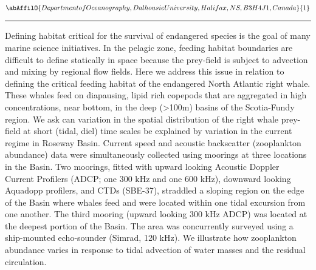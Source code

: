 \begin{center}
   \vspace{2 mm} \begin{center}
    \vspace{2 mm}\begin{center}
  
  $\abAffilO{Department of Oceanography, Dalhousie University, Halifax, NS, B3H 4J1, Canada}{1}$

  \end{center}
  \vspace{2 mm}
  \end{center}\end{center}
  \begin{center}\rule{0.70\linewidth}{0.5 pt}\end{center}

\noindent Defining habitat critical for the survival of endangered species is the goal of many marine science initiatives. In the pelagic zone, feeding habitat boundaries are difficult to define statically in space because the prey-field is subject to advection and mixing by regional flow fields. Here we address this issue in relation to defining the critical feeding habitat of the endangered North Atlantic right whale. These whales feed on diapausing, lipid rich copepods that are aggregated in high concentrations, near bottom, in the deep (>100m) basins of the Scotia-Fundy region. We ask can variation in the spatial distribution of the right whale prey-field at short (tidal, diel) time scales be explained by variation in the current regime in Roseway Basin. Current speed and acoustic backscatter (zooplankton abundance) data were simultaneously collected using moorings at three locations in the Basin. Two moorings, fitted with upward looking Acoustic Doppler Current Profilers (ADCP; one 300 kHz and one 600 kHz), downward looking Aquadopp profilers, and CTDs (SBE-37), straddled a sloping region on the edge of the Basin where whales feed and were located within one tidal excursion from one another. The third mooring (upward looking 300 kHz ADCP) was located at the deepest portion of the Basin. The area was concurrently surveyed using a ship-mounted echo-sounder (Simrad, 120 kHz). We illustrate how zooplankton abundance varies in response to tidal advection of water masses and the residual circulation. 

